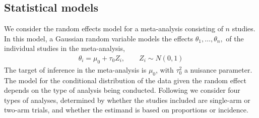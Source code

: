 \documentclass[12pt]{article}
\newcommand{\Z}{Z}
\newcommand{\n}{n}
\newcommand{\re}{\theta}
\newcommand{\munull}{\mu_0}
\newcommand{\tausqnull}{\tau^2_{0}}
\newcommand{\taunull}{\tau_0}
\begin{document}
\subsection{Statistical models}

We consider the random effects model for a meta-analysis consisting of $\n$ studies. %
In this model, a Gaussian random variable models the effects $\re_1,\ldots,\re_n,$ of the individual studies in the meta-analysis,
\begin{align}
  \re_i = \munull + \taunull\Z_i,\qquad \Z_i \sim N(0,1)
\end{align}
The target of inference in the meta-analysis is $\munull$, with
$\tausqnull$ a nuisance parameter. The model for the conditional distribution of the
data given the random effect depends on the type of
analysis being conducted. Following \citet{stijnen:10} we consider four types of analyses, determined by whether the studies included are single-arm or two-arm trials, and whether the estimand is based on proportions or incidence.
\end{document}
